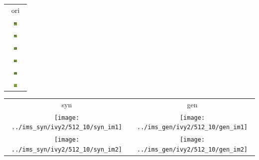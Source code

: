 \documentclass[letter]{article}
\begin{document}
\begin{table}[h!]
	\centering
	\begin{tabular}{c}
		ori\tabularnewline
		\includegraphics[width=0.17\textwidth]{../data/ivy2/512/1} \tabularnewline		\includegraphics[width=0.17\textwidth]{../data/ivy2/512/2} \tabularnewline		\includegraphics[width=0.17\textwidth]{../data/ivy2/512/3} \tabularnewline		\includegraphics[width=0.17\textwidth]{../data/ivy2/512/4} \tabularnewline		\includegraphics[width=0.17\textwidth]{../data/ivy2/512/5} \tabularnewline		\includegraphics[width=0.17\textwidth]{../data/ivy2/512/6} \tabularnewline
	\end{tabular}
	\begin{tabular}{cc}
		syn & gen\tabularnewline
		\texttt{[image: ../ims\_syn/ivy2/512\_10/syn\_im1]} & \texttt{[image: ../ims\_gen/ivy2/512\_10/gen\_im1]} \tabularnewline
		\texttt{[image: ../ims\_syn/ivy2/512\_10/syn\_im2]} & \texttt{[image: ../ims\_gen/ivy2/512\_10/gen\_im2]} \tabularnewline

\end{tabular}
\end{table}
\end{document}
